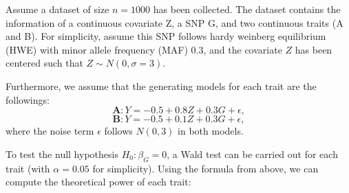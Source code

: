 \documentclass[
]{article}
\begin{document}
Assume a dataset of size \(n=1000\) has been collected. The dataset
contains the information of a continuous covariate Z, a SNP G, and two
continuous traits (A and B). For simplicity, assume this SNP follows
hardy weinberg equilibrium (HWE) with minor allele frequency (MAF)
\(0.3\), and the covariate \(Z\) has been centered such that
\(Z\sim N(0,\sigma=3)\).

Furthermore, we assume that the generating models for each trait are the
followings: \[\textbf{A}:Y = -0.5 + 0.8Z + 0.3G + \epsilon,\]
\[\textbf{B}: Y = -0.5 + 0.1Z + 0.3G + \epsilon,\] where the noise term
\(\epsilon\) follows \(N(0,3)\) in both models.

To test the null hypothesis \(H_0: \beta_G = 0\), a Wald test can be
carried out for each trait (with \(\alpha=0.05\) for simplicity). Using
the formula from above, we can compute the theoretical power of each
trait:
\end{document}

